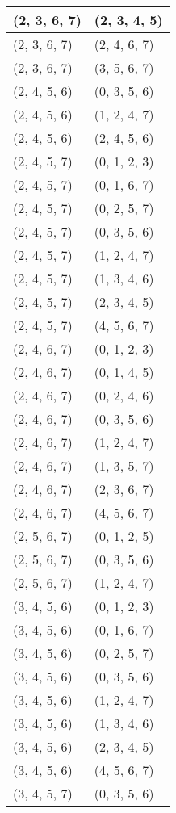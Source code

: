 \begin{footnotesize}
\begin{longtable}[c]{|l|l|}
(2, 3, 6, 7)
&(2, 3, 4, 5)
\\ \hline
(2, 3, 6, 7)
&(2, 4, 6, 7)
\\ \hline
(2, 3, 6, 7)
&(3, 5, 6, 7)
\\ \hline
(2, 4, 5, 6)
&(0, 3, 5, 6)
\\ \hline
(2, 4, 5, 6)
&(1, 2, 4, 7)
\\ \hline
(2, 4, 5, 6)
&(2, 4, 5, 6)
\\ \hline
(2, 4, 5, 7)
&(0, 1, 2, 3)
\\ \hline
(2, 4, 5, 7)
&(0, 1, 6, 7)
\\ \hline
(2, 4, 5, 7)
&(0, 2, 5, 7)
\\ \hline
(2, 4, 5, 7)
&(0, 3, 5, 6)
\\ \hline
(2, 4, 5, 7)
&(1, 2, 4, 7)
\\ \hline
(2, 4, 5, 7)
&(1, 3, 4, 6)
\\ \hline
(2, 4, 5, 7)
&(2, 3, 4, 5)
\\ \hline
(2, 4, 5, 7)
&(4, 5, 6, 7)
\\ \hline
(2, 4, 6, 7)
&(0, 1, 2, 3)
\\ \hline
(2, 4, 6, 7)
&(0, 1, 4, 5)
\\ \hline
(2, 4, 6, 7)
&(0, 2, 4, 6)
\\ \hline
(2, 4, 6, 7)
&(0, 3, 5, 6)
\\ \hline
(2, 4, 6, 7)
&(1, 2, 4, 7)
\\ \hline
(2, 4, 6, 7)
&(1, 3, 5, 7)
\\ \hline
(2, 4, 6, 7)
&(2, 3, 6, 7)
\\ \hline
(2, 4, 6, 7)
&(4, 5, 6, 7)
\\ \hline
(2, 5, 6, 7)
&(0, 1, 2, 5)
\\ \hline
(2, 5, 6, 7)
&(0, 3, 5, 6)
\\ \hline
(2, 5, 6, 7)
&(1, 2, 4, 7)
\\ \hline
(3, 4, 5, 6)
&(0, 1, 2, 3)
\\ \hline
(3, 4, 5, 6)
&(0, 1, 6, 7)
\\ \hline
(3, 4, 5, 6)
&(0, 2, 5, 7)
\\ \hline
(3, 4, 5, 6)
&(0, 3, 5, 6)
\\ \hline
(3, 4, 5, 6)
&(1, 2, 4, 7)
\\ \hline
(3, 4, 5, 6)
&(1, 3, 4, 6)
\\ \hline
(3, 4, 5, 6)
&(2, 3, 4, 5)
\\ \hline
(3, 4, 5, 6)
&(4, 5, 6, 7)
\\ \hline
(3, 4, 5, 7)
&(0, 3, 5, 6)
\\ \hline

\end{longtable}
\end{footnotesize}
